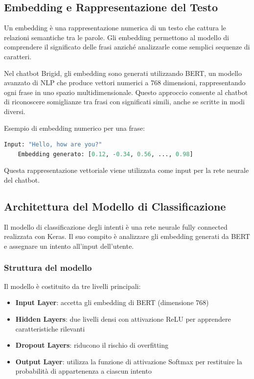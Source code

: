 \documentclass[12pt, letterpaper]{article}
\begin{document}
\subsection{Embedding e Rappresentazione del Testo}
Un embedding è una rappresentazione numerica di un testo che cattura le relazioni semantiche tra le parole. Gli embedding permettono al modello di comprendere il significato delle frasi anziché analizzarle come semplici sequenze di caratteri.

Nel chatbot Brigid, gli embedding sono generati utilizzando BERT, un modello avanzato di NLP che produce vettori numerici a 768 dimensioni, rappresentando ogni frase in uno spazio multidimensionale. Questo approccio consente al chatbot di riconoscere somiglianze tra frasi con significati simili, anche se scritte in modi diversi.

Esempio di embedding numerico per una frase:

\begin{lstlisting}[language=Python]
	Input: "Hello, how are you?"
	Embedding generato: [0.12, -0.34, 0.56, ..., 0.98]
\end{lstlisting}

Questa rappresentazione vettoriale viene utilizzata come input per la rete neurale del chatbot.

\subsection{Architettura del Modello di Classificazione}
Il modello di classificazione degli intenti è una rete neurale fully connected realizzata con Keras. Il suo compito è analizzare gli embedding generati da BERT e assegnare un intento all'input dell'utente.

\subsubsection{Struttura del modello}
Il modello è costituito da tre livelli principali:

\begin{itemize}
	\item \textbf{Input Layer}: accetta gli embedding di BERT (dimensione 768)
	\item \textbf{Hidden Layers}: due livelli densi con attivazione ReLU per apprendere caratteristiche rilevanti
	\item \textbf{Dropout Layers}: riducono il rischio di overfitting
	\item \textbf{Output Layer}: utilizza la funzione di attivazione Softmax per restituire la probabilità di appartenenza a ciascun intento
\end{itemize}
\end{document}
